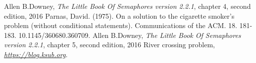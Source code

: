 \documentclass[a4paper]{article}
\begin{document}
	\pagebreak
	\begin{thebibliography}{9}
  	Allen B.Downey,
  	\textit{The Little Book Of Semaphores version 2.2.1}, chapter 4, second edition, 2016
	\textit{}Parnas, David. (1975). On a solution to the cigarette smoker's problem (without conditional statements). Communications of the ACM. 18. 181-183. 10.1145/360680.360709. 
  	Allen B.Downey,
	\textit{The Little Book Of Semaphores version 2.2.1}, chapter 5, second edition, 2016
	River crossing problem, 
	\textit{\href{https://blog.ksub.org}{https://blog.ksub.org}.}
	\end{thebibliography}
\end{document}
